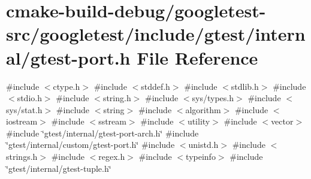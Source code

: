 \hypertarget{gtest-port_8h}{}\section{cmake-\/build-\/debug/googletest-\/src/googletest/include/gtest/internal/gtest-\/port.h File Reference}
\label{gtest-port_8h}
{\ttfamily \#include $<$ctype.\+h$>$}\newline
{\ttfamily \#include $<$stddef.\+h$>$}\newline
{\ttfamily \#include $<$stdlib.\+h$>$}\newline
{\ttfamily \#include $<$stdio.\+h$>$}\newline
{\ttfamily \#include $<$string.\+h$>$}\newline
{\ttfamily \#include $<$sys/types.\+h$>$}\newline
{\ttfamily \#include $<$sys/stat.\+h$>$}\newline
{\ttfamily \#include $<$string$>$}\newline
{\ttfamily \#include $<$algorithm$>$}\newline
{\ttfamily \#include $<$iostream$>$}\newline
{\ttfamily \#include $<$sstream$>$}\newline
{\ttfamily \#include $<$utility$>$}\newline
{\ttfamily \#include $<$vector$>$}\newline
{\ttfamily \#include \char`\"{}gtest/internal/gtest-\/port-\/arch.\+h\char`\"{}}\newline
{\ttfamily \#include \char`\"{}gtest/internal/custom/gtest-\/port.\+h\char`\"{}}\newline
{\ttfamily \#include $<$unistd.\+h$>$}\newline
{\ttfamily \#include $<$strings.\+h$>$}\newline
{\ttfamily \#include $<$regex.\+h$>$}\newline
{\ttfamily \#include $<$typeinfo$>$}\newline
{\ttfamily \#include \char`\"{}gtest/internal/gtest-\/tuple.\+h\char`\"{}}\newline
